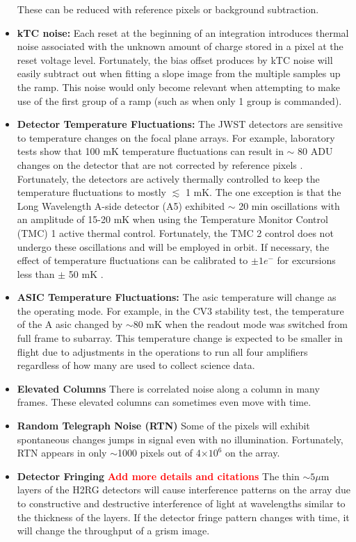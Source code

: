 \documentclass{aastex62}
\begin{document}
\begin{itemize}[noitemsep]
	These can be reduced with reference pixels or background subtraction.
	\item \textbf{kTC noise:} Each reset at the beginning of an integration introduces thermal noise associated with the unknown amount of charge stored in a pixel at the reset voltage level.
	Fortunately, the bias offset produces by kTC noise will easily subtract out when fitting a slope image from the multiple samples up the ramp.
	This noise would  only become relevant when attempting to make use of the first group of a ramp (such as when only 1 group is commanded).
	\item \textbf{Detector Temperature Fluctuations:} The JWST detectors are sensitive to temperature changes on the focal plane arrays. For example, laboratory tests show that 100 mK temperature fluctuations can result in $\sim$ 80 ADU changes on the detector that are not corrected by reference pixels \citep{hall2005jwstArrays}. Fortunately, the detectors are actively thermally controlled to keep the temperature fluctuations to mostly $\lesssim$ 1 mK.
The one exception is that the Long Wavelength A-side detector (A5) exhibited $\sim$ 20 min oscillations with an amplitude of 15-20 mK when using the Temperature Monitor Control (TMC) 1 active thermal control.
Fortunately, the TMC 2 control does not undergo these oscillations and will be employed in orbit.
If necessary, the effect of temperature fluctuations can be calibrated to $\pm 1 e^-$ for excursions less than $\pm$ 50 mK \citep{hall2005jwstArrays}.
	\item \textbf{ASIC Temperature Fluctuations:} The asic temperature will change as the operating mode. For example, in the CV3 stability test, the temperature of the A asic changed by $\sim$80 mK when the readout mode was switched from full frame to subarray.
	This temperature change is expected to be smaller in flight due to adjustments in the operations to run all four amplifiers regardless of how many are used to collect science data.
	\item \textbf{Elevated Columns} There is correlated noise along a column in many frames. These elevated columns can sometimes even move with time.
	\item \textbf{Random Telegraph Noise (RTN)} Some of the pixels will exhibit spontaneous changes jumps in signal even with no illumination. Fortunately, RTN appears in only $\sim$1000 pixels out of 4$\times 10^6$ on the array.
	\item \textbf{Detector Fringing} \textbf{\textcolor{red}{Add more details and citations}} The thin $\sim 5\mu$m layers of the H2RG detectors will cause interference patterns on the array due to constructive and destructive interference of light at wavelengths similar to the thickness of the layers. If the detector fringe pattern changes with time, it will change the throughput of a grism image.

\end{itemize}
\end{document}
